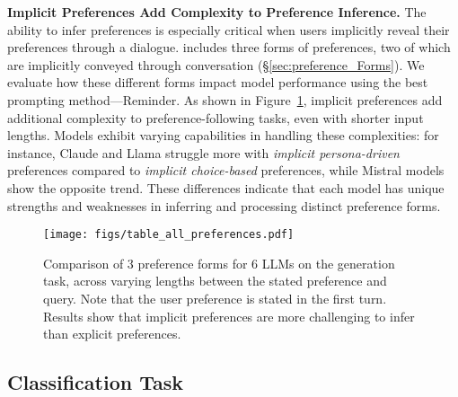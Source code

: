 \textbf{Implicit Preferences Add Complexity to Preference Inference.}
\label{sec: pref forms comparison} The ability to infer preferences is especially critical when users implicitly reveal their preferences through a dialogue. \ours{} includes three forms of preferences, two of which are implicitly conveyed through conversation (\S\ref{sec:preference_Forms}). We evaluate how these different forms impact model performance using the best prompting method—Reminder. As shown in Figure~\ref{fig: pref_forms_comparison}, implicit preferences add additional complexity to preference-following tasks, even with shorter input lengths. Models exhibit varying capabilities in handling these complexities: for instance, Claude and Llama struggle more with \textit{implicit persona-driven} preferences compared to \textit{implicit choice-based} preferences, while Mistral models show the opposite trend. These differences indicate that each model has unique strengths and weaknesses in inferring and processing distinct preference forms.

\begin{figure}[t]
    \centering
    \texttt{[image: figs/table\_all\_preferences.pdf]}
\caption{Comparison of 3 preference forms for 6 LLMs on the generation task, across varying lengths between the stated preference and query. Note that the user preference is stated in the first turn. Results show that implicit preferences are more challenging to infer than explicit preferences.}
    \label{fig: pref_forms_comparison}
\end{figure}


\subsection{Classification Task}
\label{sec: mcq task}

